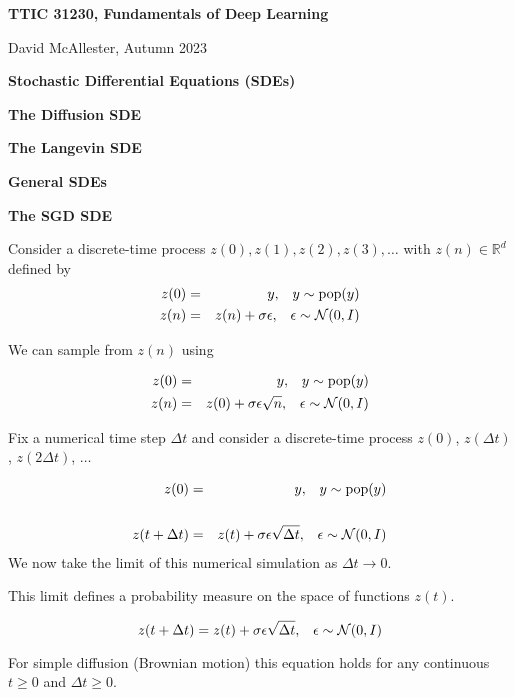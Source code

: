 




{\Huge

\centerline{\bf TTIC 31230, Fundamentals of Deep Learning}
\bigskip
\centerline{David McAllester, Autumn 2023}
\vfill
\centerline{\bf Stochastic Differential Equations (SDEs)}
\vfill
\vfill
\centerline{\bf The Diffusion SDE}
\vfill
\centerline{\bf The Langevin SDE}
\vfill
\centerline{\bf General SDEs}
\vfill
\centerline{\bf The SGD SDE}

Consider a discrete-time process $z(0),z(1),z(2),z(3),\ldots$ with $z(n)\in \mathbb{R}^d$ defined by
\begin{eqnarray*}
  z(0) & = & y,\;\;\;y \sim \mathrm{pop}(y) \\
  z(n) & = & z(n) + \sigma\epsilon,\;\;\;\epsilon \sim {\cal N}(0,I)
\end{eqnarray*}

\vfill
We can sample from $z(n)$ using

\begin{eqnarray*}
  z(0) & = & y,\;\;\;y \sim \mathrm{pop}(y) \\
  z(n) & = & z(0) + \sigma\epsilon\sqrt{n} ,\;\;\;\epsilon \sim {\cal N}(0,I)
\end{eqnarray*}

Fix a numerical time step $\Delta t$ and consider a discrete-time process $z(0)$, $z(\Delta t)$, $z(2\Delta t)$, $\ldots$

{\huge
\begin{eqnarray*}
  z(0) & = & y,\;\;\;y \sim \mathrm{pop}(y) \\
  \\
  z(t+\Delta t) & = & z(t) + \sigma\epsilon\sqrt{\Delta t},\;\;\;\epsilon\sim {\cal N}(0,I) \\
\end{eqnarray*}
}
We now take the limit of this numerical simulation as $\Delta t \rightarrow 0$.

\vfill
This limit defines a probability measure on the space of functions $z(t)$.


$$z(t+\Delta t) =  z(t) + \sigma\epsilon\sqrt{\Delta t},\;\;\;\epsilon \sim {\cal N}(0,I)$$

\vfill
For simple diffusion (Brownian motion) this equation holds for any continuous $t \geq 0$
and $\Delta t \geq 0$.


}
